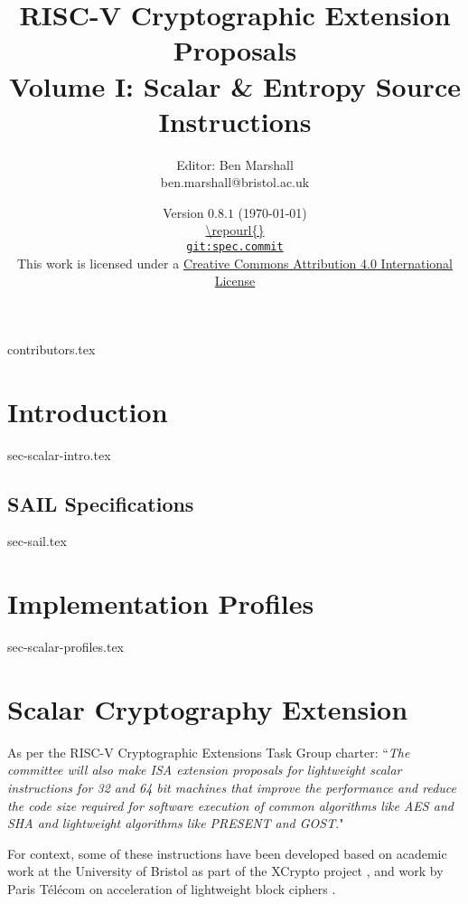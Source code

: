 \documentclass[11pt]{article}
\title{RISC-V Cryptographic Extension Proposals\\Volume I: Scalar \& Entropy Source Instructions}
\author{Editor: Ben Marshall\\ben.marshall@bristol.ac.uk}
\date{Version $0.8.1$ (\today) \\
\medskip
\url{\repourl{}} \\
\href{\repourl{}}{
{\small \tt git:{spec.commit}}} \\
\bigskip
{\small
This work is licensed under a
\href{http://creativecommons.org/licenses/by/4.0/}{Creative Commons Attribution 4.0 International License}
}
}
\begin{document}

\maketitle

{contributors.tex}

\tableofcontents




\newpage
\section{Introduction}
\label{sec:intro}
{sec-scalar-intro.tex}

\subsection{SAIL Specifications}
\label{sec:sail}
{sec-sail.tex}

\newpage
\section{Implementation Profiles}
\label{sec:profiles}
{sec-scalar-profiles.tex}

\clearpage
\section{Scalar Cryptography Extension}
\label{sec:scalar}

As per the RISC-V Cryptographic Extensions Task Group charter:
``{\em The committee will also make ISA extension proposals for lightweight
scalar instructions for 32 and 64 bit machines that improve the performance
and reduce the code size required for software execution of common algorithms
like AES and SHA and lightweight algorithms like PRESENT and GOST}."

\bigskip

For context, some of these instructions have been developed based on academic
work at the University of Bristol as part of the XCrypto project
\cite{MPP:19},
and work by
Paris T\'{e}l\'{e}com on acceleration of lightweight block ciphers
\cite{TGMGD:19}.


\end{document}
